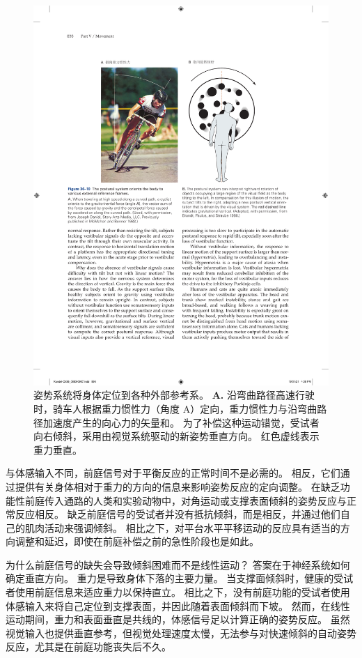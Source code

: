 \begin{figure}[htbp]
	\centering
	\includegraphics[width=0.8\linewidth]{chap36/fig_36_10}
	\caption{姿势系统将身体定位到各种外部参考系。
		\textbf{A.} 沿弯曲路径高速行驶时，骑车人根据重力惯性力（角度 A）定向，重力惯性力与沿弯曲路径加速度产生的向心力的矢量和。
		为了补偿这种运动错觉，受试者向右倾斜，采用由视觉系统驱动的新姿势垂直方向。
		红色虚线表示重力垂直。 }
	\label{fig:36_10}
\end{figure}


与体感输入不同，前庭信号对于平衡反应的正常时间不是必需的。
相反，它们通过提供有关身体相对于重力的方向的信息来影响姿势反应的定向调整。
在缺乏功能性前庭传入通路的人类和实验动物中，对角运动或支撑表面倾斜的姿势反应与正常反应相反。
缺乏前庭信号的受试者并没有抵抗倾斜，而是相反，并通过他们自己的肌肉活动来强调倾斜。
相比之下，对平台水平平移运动的反应具有适当的方向调整和延迟，即使在前庭补偿之前的急性阶段也是如此。


为什么前庭信号的缺失会导致倾斜困难而不是线性运动？
答案在于神经系统如何确定垂直方向。
重力是导致身体下落的主要力量。
当支撑面倾斜时，健康的受试者使用前庭信息来适应重力以保持直立。
相比之下，没有前庭功能的受试者使用体感输入来将自己定位到支撑表面，并因此随着表面倾斜而下坡。
然而，在线性运动期间，重力和表面垂直是共线的，体感信号足以计算正确的姿势反应。
虽然视觉输入也提供垂直参考，但视觉处理速度太慢，无法参与对快速倾斜的自动姿势反应，尤其是在前庭功能丧失后不久。


